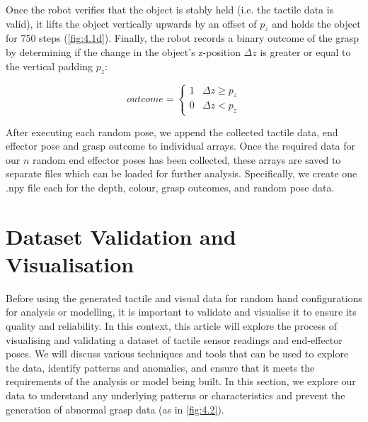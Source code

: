 \documentclass[11pt, a4paper]{report}
\begin{document}
Once the robot verifies that the object is stably held (i.e. the tactile data is valid), it lifts the object vertically upwards by an offset of $p_z$ and holds the object for 750 steps (\ref{fig:4.1d}). Finally, the robot records a binary outcome of the grasp by determining if the change in the object's z-position $\Delta z$ is greater or equal to the vertical padding $p_z$:

\begin{equation}
    outcome=\begin{cases}1 & \Delta z\geq p_z \\ 0 & \Delta z<p_z\end{cases}
\end{equation}

After executing each random pose, we append the collected tactile data, end effector pose and grasp outcome to individual arrays. Once the required data for our $n$ random end effector poses has been collected, these arrays are saved to separate files which can be loaded for further analysis. Specifically, we create one .npy file each for the depth, colour, grasp outcomes, and random pose data.


\section{Dataset Validation and Visualisation}
\label{sec:4.3}
Before using the generated tactile and visual data for random hand configurations for analysis or modelling, it is important to validate and visualise it to ensure its quality and reliability. In this context, this article will explore the process of visualising and validating a dataset of tactile sensor readings and end-effector poses. We will discuss various techniques and tools that can be used to explore the data, identify patterns and anomalies, and ensure that it meets the requirements of the analysis or model being built. In this section, we explore our data to understand any underlying patterns or characteristics and prevent the generation of abnormal grasp data (as in \ref{fig:4.2}).
\end{document}
